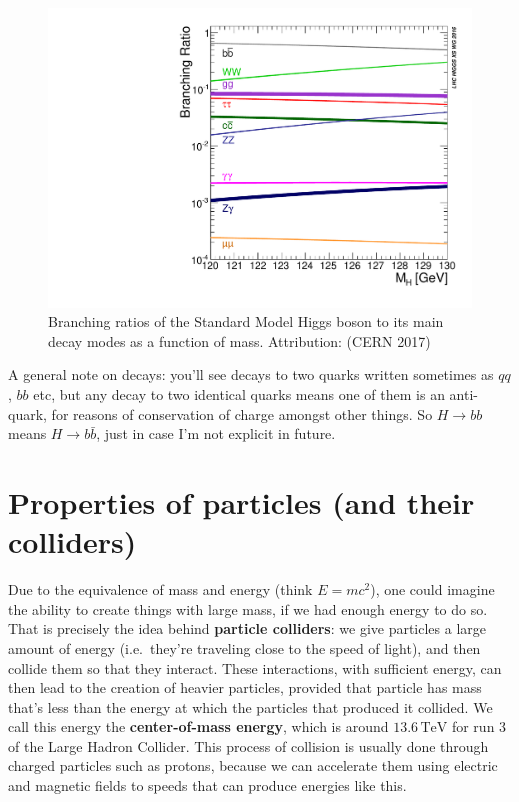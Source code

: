 \documentclass[
  11pt,
  numbers=noendperiod]{book}
\begin{document}
\begin{figure}

{\centering \includegraphics{./images/SMHiggsBR_120-130.pdf}

}

\caption{\label{fig-higgs-ratios}Branching ratios of the Standard Model
Higgs boson to its main decay modes as a function of mass. Attribution:
(CERN 2017)}

\end{figure}

A general note on decays: you'll see decays to two quarks written
sometimes as \(qq\), \(bb\) etc, but any decay to two identical quarks
means one of them is an anti-quark, for reasons of conservation of
charge amongst other things. So \(H\rightarrow bb\) means
\(H\rightarrow b\bar{b}\), just in case I'm not explicit in future.

\hypertarget{properties-of-particles-and-their-colliders}{%
\section{Properties of particles (and their
colliders)}\label{properties-of-particles-and-their-colliders}}

Due to the equivalence of mass and energy (think \(E=mc^2\)), one could
imagine the ability to create things with large mass, if we had enough
energy to do so. That is precisely the idea behind \textbf{particle
colliders}: we give particles a large amount of energy (i.e.~they're
traveling close to the speed of light), and then collide them so that
they interact. These interactions, with sufficient energy, can then lead
to the creation of heavier particles, provided that particle has mass
that's less than the energy at which the particles that produced it
collided. We call this energy the \textbf{center-of-mass energy}, which
is around \(13.6 \,\text{TeV}\) for run 3 of the Large Hadron Collider.
This process of collision is usually done through charged particles such
as protons, because we can accelerate them using electric and magnetic
fields to speeds that can produce energies like this.
\end{document}
